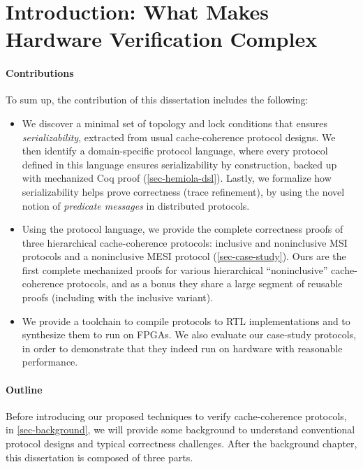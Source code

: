 \chapter{Introduction: What Makes Hardware Verification Complex}


\subsubsection{Contributions}

To sum up, the contribution of this dissertation includes the following:
\begin{itemize}
\item We discover a minimal set of topology and lock conditions that ensures \emph{serializability}, extracted from usual cache-coherence protocol designs.
  We then identify a domain-specific protocol language, where every protocol defined in this language ensures serializability by construction, backed up with mechanized Coq proof (\autoref{sec-hemiola-dsl}).
  Lastly, we formalize how serializability helps prove correctness (trace refinement), by using the novel notion of \emph{predicate messages} in distributed protocols.
\item Using the protocol language, we provide the complete correctness proofs of three hierarchical cache-coherence protocols: inclusive and noninclusive MSI protocols and a noninclusive MESI protocol (\autoref{sec-case-study}).
  Ours are the first complete mechanized proofs for various hierarchical ``noninclusive'' cache-coherence protocols, and as a bonus they share a large segment of reusable proofs (including with the inclusive variant).
\item We provide a toolchain to compile \hemiola{} protocols to RTL implementations and to synthesize them to run on FPGAs.
  We also evaluate our case-study protocols, in order to demonstrate that they indeed run on hardware with reasonable performance.
\end{itemize}

\subsubsection{Outline}

Before introducing our proposed techniques to verify cache-coherence protocols, in \autoref{sec-background}, we will provide some background to understand conventional protocol designs and typical correctness challenges.
After the background chapter, this dissertation is composed of three parts.

